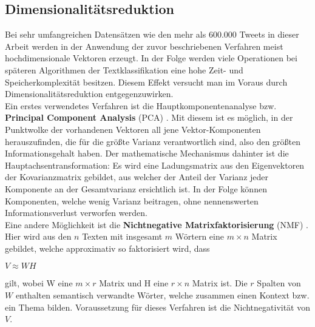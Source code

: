 \subsection{Dimensionalitätsreduktion}\label{dim-red}
Bei sehr umfangreichen Datensätzen wie den mehr als 600.000 Tweets in dieser Arbeit werden in der Anwendung der zuvor beschriebenen Verfahren meist hochdimensionale Vektoren erzeugt. In der Folge werden viele Operationen bei späteren Algorithmen der Textklassifikation eine hohe Zeit- und Speicherkomplexität besitzen. Diesem Effekt versucht man im Voraus durch Dimensionalitätsreduktion entgegenzuwirken.\\
Ein erstes verwendetes Verfahren ist die Hauptkomponentenanalyse bzw. \textbf{Principal Component Analysis} (PCA) \citep{Jol02}. Mit diesem ist es möglich, in der Punktwolke der vorhandenen Vektoren all jene Vektor-Komponenten herauszufinden, die für die größte Varianz verantwortlich sind, also den größten Informationsgehalt haben. Der mathematische Mechanismus dahinter ist die Hauptachsentransformation: Es wird eine Ladungsmatrix aus den Eigenvektoren der Kovarianzmatrix gebildet, aus welcher der Anteil der Varianz jeder Komponente an der Gesamtvarianz ersichtlich ist. In der Folge können Komponenten, welche wenig Varianz beitragen, ohne nennenswerten Informationsverlust verworfen werden.\\
Eine andere Möglichkeit ist die \textbf{Nichtnegative Matrixfaktorisierung} (NMF) \citep{LeeSeung99}. Hier wird aus den $n$ Texten mit insgesamt $m$ Wörtern eine $m \times n$ Matrix gebildet, welche approximativ so faktorisiert wird, dass
\begin{center}
	$V \approx W H$
\end{center}
gilt, wobei W eine $m \times r$ Matrix und H eine $r \times n$ Matrix ist. Die $r$ Spalten von $W$ enthalten semantisch verwandte Wörter, welche zusammen einen Kontext bzw. ein Thema bilden. Voraussetzung für dieses Verfahren ist die Nichtnegativität von $V$.\pagebreak